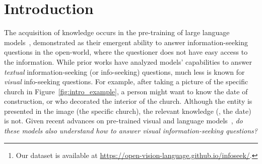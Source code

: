 \documentclass[11pt]{article}
\begin{document}
\clearpage{}
\maketitle
\begin{abstract}
    Pre-trained vision and language
models~\cite{chen2022pali,chen2023pali,dai2023instructblip,li2023blip} have demonstrated state-of-the-art capabilities over existing tasks involving images and texts, including visual question answering. However, it remains unclear whether these models possess the capability to answer questions that are not only querying visual content but knowledge-intensive and information-seeking. In this study, we introduce \infoseek\footnote{Our dataset is available at \url{https://open-vision-language.github.io/infoseek/}.}, a visual question answering dataset tailored for information-seeking questions that cannot be answered with only common sense knowledge. 
Using \infoseek, we analyze various pre-trained visual question answering models and gain insights into their characteristics. Our findings reveal that state-of-the-art pre-trained multi-modal models (\eg, PaLI-X, BLIP2, etc.) face challenges in answering visual information-seeking questions, but fine-tuning on the \ourdataset dataset elicits models to use fine-grained knowledge that was learned during their pre-training.
Furthermore, we show that accurate visual entity recognition can be used to improve performance on \ourdataset by retrieving relevant documents, showing a significant space for improvement. \end{abstract}


\section{Introduction}
\label{sec:intro}
The acquisition of knowledge occurs in the pre-training of large language models~\cite{brown2020language,chowdhery2022palm}, demonstrated as their emergent ability to answer information-seeking questions in the open-world, where the questioner does not have easy access to the information. 
While prior works have analyzed models' capabilities to answer {\em textual} information-seeking (or info-seeking) questions, much less is known for {\em visual} info-seeking questions. For example, after taking a picture of the specific church in Figure~\ref{fig:intro_example}, a person might want to know the date of construction, or who decorated the interior of the church. Although the entity is presented in the image (the specific church), the relevant knowledge (\eg, the date) is not.
Given recent advances on pre-trained visual and language models~\cite{alayrac2022flamingo, chen2022pali, li2023blip}, {\em {do these models also understand how to answer visual information-seeking questions?}}
\end{document}
